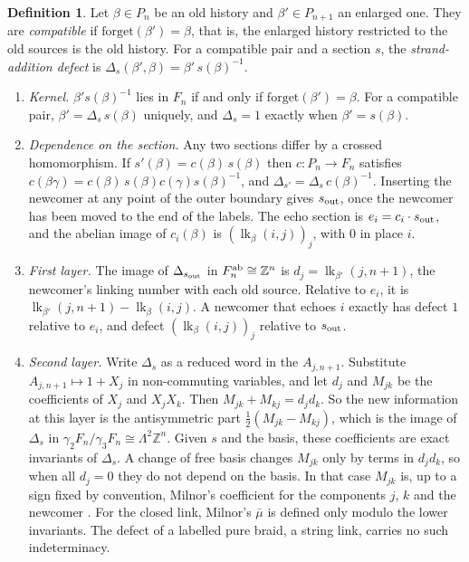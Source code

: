 \documentclass[11pt]{article}
\theoremstyle{definition}\newtheorem{definition}[theorem]{Definition}\newtheorem{remark}[theorem]{Remark}\newtheorem{example}[theorem]{Example}\newtheorem{problem}[theorem]{Open problem}\crefname{problem}{Problem}{Problems}
\begin{document}
\begin{definition}\label{def:defect}
Let $\beta\in P_n$ be an old history and $\beta'\in P_{n+1}$ an enlarged one. They are \emph{compatible} if $\mathrm{forget}(\beta')=\beta$, that is, the enlarged history restricted to the old sources is the old history. For a compatible pair and a section $s$, the \emph{strand-addition defect} is $\Delta_s(\beta',\beta)=\beta'\,s(\beta)^{-1}$.
\end{definition}

\begin{proposition}\label{prop:defect}
\begin{enumerate}
\item[(i)] \emph{Kernel.} $\beta's(\beta)^{-1}$ lies in $F_n$ if and only if $\mathrm{forget}(\beta')=\beta$. For a compatible pair, $\beta'=\Delta_s\,s(\beta)$ uniquely, and $\Delta_s=1$ exactly when $\beta'=s(\beta)$.
\item[(ii)] \emph{Dependence on the section.} Any two sections differ by a crossed homomorphism. If $s'(\beta)=c(\beta)\,s(\beta)$ then $c:P_n\to F_n$ satisfies $c(\beta\gamma)=c(\beta)\,s(\beta)c(\gamma)s(\beta)^{-1}$, and $\Delta_{s'}=\Delta_s\,c(\beta)^{-1}$. Inserting the newcomer at any point of the outer boundary gives $s_{\rm out}$, once the newcomer has been moved to the end of the labels. The echo section is $e_i=c_i\cdot s_{\rm out}$, and the abelian image of $c_i(\beta)$ is $(\operatorname{lk}_\beta(i,j))_{j}$, with $0$ in place $i$.
\item[(iii)] \emph{First layer.} The image of $\Delta_{s_{\rm out}}$ in $F_n^{\rm ab}\cong\mathbb Z^n$ is $d_j=\operatorname{lk}_{\beta'}(j,n+1)$, the newcomer's linking number with each old source. Relative to $e_i$, it is $\operatorname{lk}_{\beta'}(j,n+1)-\operatorname{lk}_\beta(i,j)$. A newcomer that echoes $i$ exactly has defect $1$ relative to $e_i$, and defect $(\operatorname{lk}_\beta(i,j))_j$ relative to $s_{\rm out}$.
\item[(iv)] \emph{Second layer.} Write $\Delta_s$ as a reduced word in the $A_{j,n+1}$. Substitute $A_{j,n+1}\mapsto 1+X_j$ in non-commuting variables, and let $d_j$ and $M_{jk}$ be the coefficients of $X_j$ and $X_jX_k$. Then $M_{jk}+M_{kj}=d_jd_k$. So the new information at this layer is the antisymmetric part $\tfrac12(M_{jk}-M_{kj})$, which is the image of $\Delta_s$ in $\gamma_2F_n/\gamma_3F_n\cong\Lambda^2\mathbb Z^n$. Given $s$ and the basis, these coefficients are exact invariants of $\Delta_s$. A change of free basis changes $M_{jk}$ only by terms in $d_jd_k$, so when all $d_j=0$ they do not depend on the basis. In that case $M_{jk}$ is, up to a sign fixed by convention, Milnor's coefficient for the components $j$, $k$ and the newcomer \cite{Milnor1954,HabeggerLin1990}. For the closed link, Milnor's $\bar\mu$ is defined only modulo the lower invariants. The defect of a labelled pure braid, a string link, carries no such indeterminacy.

\end{enumerate}
\end{proposition}
\end{document}
